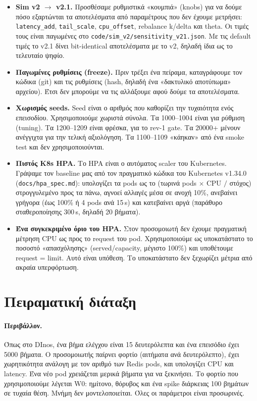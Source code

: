 \documentclass[11pt,a4paper]{article}
\newcommand{\kode}[1]{\texttt{#1}}
\begin{document}
\begin{itemize}
\item \textbf{Sim v2 $\to$ v2.1.} Προσθέσαμε ρυθμιστικά «κουμπιά» (knobs) για να δούμε πόσο εξαρτώνται τα αποτελέσματα από παραμέτρους που δεν έχουμε μετρήσει: \kode{latency\_add}, \kode{tail\_scale}, \kode{cpu\_offset}, rebalance k/delta και theta. Οι τιμές τους είναι παγωμένες στο \kode{code/sim\_v2/sensitivity\_v21.json}. Με τις default τιμές το v2.1 δίνει bit-identical αποτελέσματα με το v2, δηλαδή ίδια ως το τελευταίο ψηφίο.
\item \textbf{Παγωμένες ρυθμίσεις (freeze).} Πριν τρέξει ένα πείραμα, καταγράφουμε τον κώδικα (git) και τις ρυθμίσεις (hash, δηλαδή ένα «δακτυλικό αποτύπωμα» αρχείου). Έτσι δεν μπορούμε να τις αλλάξουμε αφού δούμε τα αποτελέσματα.
\item \textbf{Χωρισμός seeds.} Seed είναι ο αριθμός που καθορίζει την τυχαιότητα ενός επεισοδίου. Χρησιμοποιούμε χωριστά σύνολα. Τα 1000--1004 είναι για ρύθμιση (tuning). Τα 1200--1209 είναι φρέσκα, για το rev-1 gate. Τα 20000+ μένουν ανέγγιχτα για την τελική αξιολόγηση. Τα 1100--1109 «κάηκαν» από ένα smoke test και δεν χρησιμοποιούνται.
\item \textbf{Πιστός K8s HPA.} Το HPA είναι ο αυτόματος scaler του Kubernetes. Γράψαμε τον baseline μας από τον πραγματικό κώδικα του Kubernetes v1.34.0 (\kode{docs/hpa\_spec.md}): υπολογίζει τα pods ως το (τωρινά pods $\times$ CPU $/$ στόχος) στρογγυλεμένο προς τα πάνω, αγνοεί αλλαγές μέσα σε ανοχή 10\%, ανεβαίνει γρήγορα (έως 100\% ή 4 pods ανά 15\,s) και κατεβαίνει αργά (παράθυρο σταθεροποίησης 300\,s, δηλαδή 20 βήματα).
\item \textbf{Ένα συγκεκριμένο όριο του HPA.} Στον προσομοιωτή δεν έχουμε πραγματική μέτρηση CPU ως προς το request του pod. Χρησιμοποιούμε ως υποκατάστατο το ποσοστό «απασχόλησης» (served/capacity, μέγιστο 100\%) και υποθέτουμε request = limit. Αυτό είναι υπόθεση. Το υποκατάστατο δεν ξεχωρίζει μέτρια από ακραία υπερφόρτωση.
\end{itemize}

\section{Πειραματική διάταξη}

\paragraph{Περιβάλλον.} Όπως στο DInos, ένα βήμα ελέγχου είναι 15 δευτερόλεπτα και ένα επεισόδιο έχει 5000 βήματα. Ο προσομοιωτής παίρνει φορτίο (αιτήματα ανά δευτερόλεπτο), έχει χωρητικότητα ανάλογη με τον αριθμό των Redis pods, και υπολογίζει CPU και latency. Ένα νέο pod χρειάζεται μερικά βήματα για να ξεκινήσει. Το φορτίο που χρησιμοποιούμε λέγεται W0: ημίτονο, θόρυβος και ένα spike διάρκειας 100 βημάτων σε τυχαία θέση. Μνήμη δεν μοντελοποιείται. Όλες οι παράμετροι είναι προσωρινές.
\end{document}
